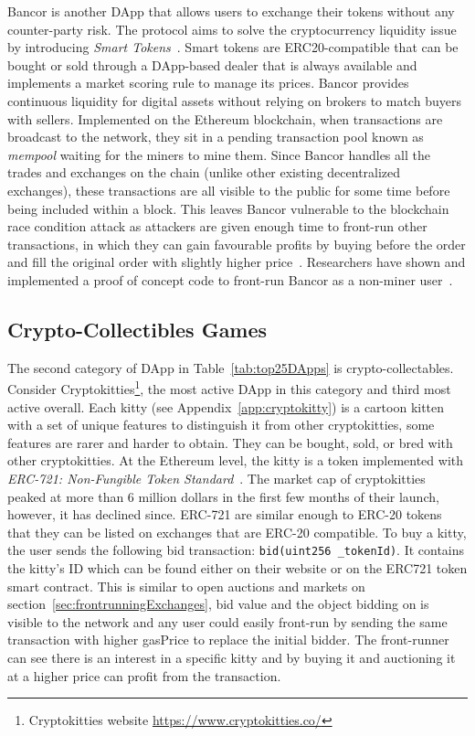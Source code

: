 Bancor is another DApp that allows users to exchange their tokens without any counter-party risk. The protocol aims to solve the cryptocurrency liquidity issue by introducing \textit{Smart Tokens}~\cite{hertzog2017bancor}. Smart tokens are ERC20-compatible that can be bought or sold through a DApp-based dealer that is always available and implements a market scoring rule to manage its prices. Bancor provides continuous liquidity for digital assets without relying on brokers to match buyers with sellers. Implemented on the Ethereum blockchain, when transactions are broadcast to the network, they sit in a pending transaction pool known as \textit{mempool} waiting for the miners to mine them. Since Bancor handles all the trades and exchanges on the chain (unlike other existing decentralized exchanges), these transactions are all visible to the public for some time before being included within a block. This leaves Bancor vulnerable to the blockchain race condition attack as attackers are given enough time to front-run other transactions, in which they can gain favourable profits by buying before the order and fill the original order with slightly higher price~\cite{BancorIs7:online}. Researchers have shown and implemented a proof of concept code to front-run Bancor as a non-miner user~\cite{NewTab13:online}.


\subsection{Crypto-Collectibles Games}\label{sec:cryptogames}

The second category of DApp in Table~\ref{tab:top25DApps} is crypto-collectables. Consider Cryptokitties\footnote{Cryptokitties website \url{https://www.cryptokitties.co/}}, the most active DApp in this category and third most active overall. Each kitty (see Appendix~\ref{app:cryptokitty}) is a cartoon kitten with a set of unique features to distinguish it from other cryptokitties, some features are rarer and harder to obtain. They can be bought, sold, or bred with other cryptokitties. At the Ethereum level, the kitty is a token implemented with \textit{ERC-721: Non-Fungible Token Standard}~\cite{erc721}. The market cap of cryptokitties peaked at more than 6 million dollars in the first few months of their launch, however, it has declined since. ERC-721 are similar enough to ERC-20 tokens that they can be listed on exchanges that are ERC-20 compatible. To buy a kitty, the user sends the following bid transaction: \texttt{bid(uint256 \_tokenId)}. It contains the kitty's ID which can be found either on their website or on the ERC721 token smart contract. This is similar to open auctions and markets on section~\ref{sec:frontrunningExchanges}, bid value and the object bidding on is visible to the network and any user could  easily front-run by sending the same transaction with higher gasPrice to replace the initial bidder. The front-runner can see there is an interest in a specific kitty and by buying it and auctioning it at a higher price can profit from the transaction. %

